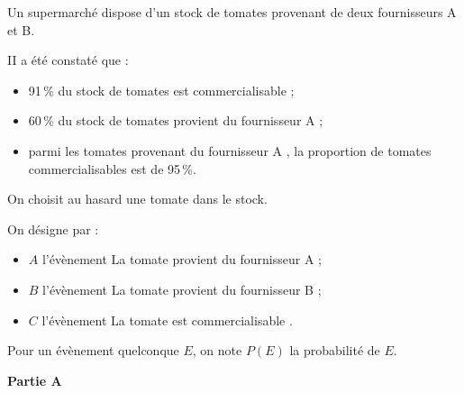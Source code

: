 
Un supermarché dispose d'un stock de tomates provenant de deux fournisseurs A et B.

II a été constaté que :

\begin{itemize}[label=$\bullet~$]
\item 91\,\% du stock de tomates est commercialisable ;
\item 60\,\% du stock de tomates provient du fournisseur A ;
\item parmi les tomates provenant du fournisseur A , la proportion de tomates commercialisables
est de 95\,\%.
\end{itemize}

On choisit au hasard une tomate dans le stock.

On désigne par :
\begin{itemize}[label=$\bullet~$]
\item $A$ l'évènement \og La tomate provient du fournisseur A \fg ;
\item $B$ l'évènement \og La tomate provient du fournisseur B \fg ;
\item $C$ l'évènement \og La tomate est commercialisable \fg.
\end{itemize}

Pour un évènement quelconque $E$, on note $P(E)$ la probabilité de $E$.

\medskip

\textbf{Partie A}

\medskip


